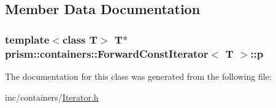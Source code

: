 \subsection{Member Data Documentation}
\subsubsection[{\texorpdfstring{p}{p}}]{\setlength{\rightskip}{0pt plus 5cm}template$<$class T$>$ T$\ast$ {\bf prism\+::containers\+::\+Forward\+Const\+Iterator}$<$ T $>$\+::p}\hypertarget{classprism_1_1containers_1_1_forward_const_iterator_a26647b955a51f4fb4d29d1b06dd75cd9}{}\label{classprism_1_1containers_1_1_forward_const_iterator_a26647b955a51f4fb4d29d1b06dd75cd9}


The documentation for this class was generated from the following file\+:\begin{DoxyCompactItemize}
\item 
inc/containers/\hyperlink{_iterator_8h}{Iterator.\+h}\end{DoxyCompactItemize}
